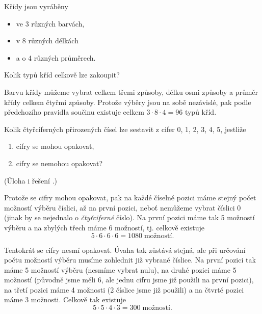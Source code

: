\begin{task}
    Křídy jsou vyráběny
    \begin{itemize}
        \item ve 3 různých barvách,
        \item v 8 různých délkách
        \item a o 4 různých průměrech.
    \end{itemize}
    Kolik typů kříd celkově lze zakoupit? \citep[str. 29]{Brualdi2018}
\end{task}
\begin{solution}
    Barvu křídy můžeme vybrat celkem třemi způsoby, délku osmi způsoby a průměr křídy celkem čtyřmi způsoby. Protože výběry jsou na sobě nezávislé, pak podle předchozího pravidla součinu existuje celkem $3\cdot 8\cdot 4=96$ typů kříd.
\end{solution}

\begin{task}
    Kolik čtyřciferných přirozených čísel lze sestavit z cifer 0, 1, 2, 3, 4, 5, jestliže
    \begin{enumerate}[label=(\alph*)]
        \item cifry se mohou opakovat,
        \item cifry se nemohou opakovat?
    \end{enumerate}
    (Úloha i řešení \citep[str. 7]{Slavik2022}.)
\end{task}
\begin{solution}[Řešení (a)]
    Protože se cifry mohou opakovat, pak na každé číselné pozici máme stejný počet možností výběru číslici, až na první pozici, neboť nemůžeme vybrat číslici 0 (jinak by se nejednalo o \emph{čtyřciferné} číslo). Na první pozici máme tak 5 možností výběru a na zbylých třech máme 6 možností, tj. celkově existuje
    \begin{equation*}
        5\cdot 6\cdot 6\cdot 6 = 1080\;\text{možností.}
    \end{equation*}
\end{solution}
\begin{solution}[Řešení (b)]
    Tentokrát se cifry nesmí opakovat. Úvaha tak zůstává stejná, ale při určování počtu možností výběru musíme zohlednit již vybrané číslice. Na první pozici tak máme 5 možností výběru (nesmíme vybrat nulu), na druhé pozici máme 5 možností (původně jsme měli 6, ale jednu cifru jsme již použili na první pozici), na třetí pozici máme 4 možnosti (2 číslice jsme již použili) a na čtvrté pozici máme 3 možnosti. Celkově tak existuje
    \begin{equation*}
        5\cdot 5\cdot 4\cdot 3=300\;\text{možností.}
    \end{equation*}
\end{solution}

